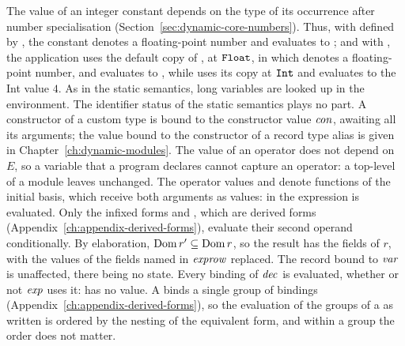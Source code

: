 \begin{rulecomments}
 The value of an integer constant depends on the
type of its occurrence after number specialisation
(Section~\ref{sec:dynamic-core-numbers}). Thus, with  defined
by , the constant denotes a floating-point number and
 evaluates to ; and with
, the application  uses the default copy of
, at $\mathtt{Float}$, in which  denotes a floating-point number, and
evaluates to , while  uses its copy at $\mathtt{Int}$ and
evaluates to the Int value $4$. %
 As in the static semantics, long variables are
looked up in the environment. The identifier status of the static semantics
plays no part.
 A constructor of a custom type is bound to the
constructor value $\mathit{con}$, awaiting all its arguments; the value bound to the
constructor of a record type alias is given in
Chapter~\ref{ch:dynamic-modules}.
 The value of an operator does not depend on $E$, so
a variable that a program declares cannot capture an operator: a top-level
 of a module leaves \kw{(+)} unchanged. The operator values
\kw{(\&\&)} and \kw{(||)} denote
functions of the initial basis, which receive both arguments as values: in
 the expression  is evaluated. Only the infixed forms
 and , which are derived forms
(Appendix~\ref{ch:appendix-derived-forms}), evaluate their second operand
conditionally. %
 By elaboration, $\mathrm{Dom}\, r'\subseteq\mathrm{Dom}\, r$, so the
result has the fields of $r$, with the values of the fields named in
$\mathit{exprow}$ replaced. The record bound to $\mathit{var}$ is unaffected, there being no
state.
 Every binding of $\mathit{dec}$ is evaluated, whether or not
$\mathit{exp}$ uses it:  has no value. A 
binds a single group of bindings (Appendix~\ref{ch:appendix-derived-forms}),
so the evaluation of the groups of a  as written is ordered by the
nesting of the equivalent form, and within a group the order does not
matter. %
\end{rulecomments}


  {}

